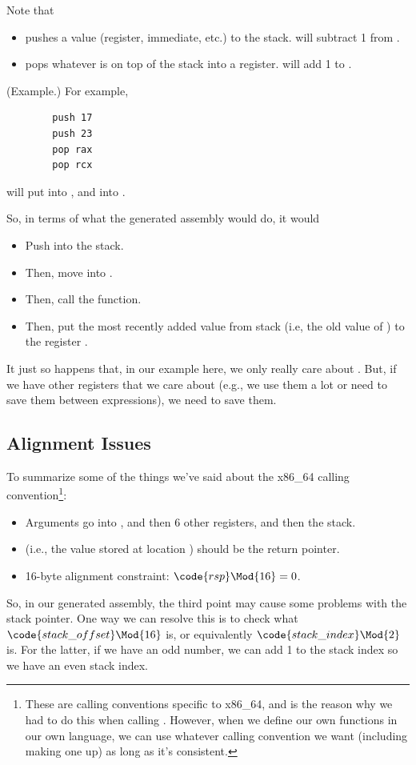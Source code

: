 \bigskip 

Note that 
\begin{itemize}
    \item {} pushes a value (register, immediate, etc.) to the stack.  will subtract 1 from . 
    \item {} pops whatever is on top of the stack into a register.  will add 1 to . 
\end{itemize}
\begin{mdframed}[nobreak=true]
    (Example.) For example, 
    \begin{verbatim}
        push 17 
        push 23 
        pop rax 
        pop rcx \end{verbatim}
    will put  into , and  into .
\end{mdframed}
So, in terms of what the generated assembly would do, it would 
\begin{itemize}
    \item Push  into the stack. 
    \item Then, move  into .
    \item Then, call the  function. 
    \item Then, put the most recently added value from stack (i.e, the old value of ) to the register .
\end{itemize}
It just so happens that, in our example here, we only really care about . But, if we have other registers that we care about (e.g., we use them a lot or need to save them between expressions), we need to save them. 

\subsection{Alignment Issues}
To summarize some of the things we've said about the x86\_64 calling convention\footnote{These are calling conventions specific to x86\_64, and is the reason why we had to do this when calling . However, when we define our own functions in our own language, we can use whatever calling convention we want (including making one up) as long as it's consistent. }:
\begin{itemize}
    \item Arguments go into , and then 6 other registers, and then the stack.
    \item \code{[rsp]} (i.e., the value stored at location ) should be the return pointer.
    \item 16-byte alignment constraint: $\code{rsp} \Mod{16} = 0$.
\end{itemize}
So, in our generated assembly, the third point may cause some problems with the stack pointer. One way we can resolve this is to check what $\code{stack\_offset} \Mod{16}$ is, or equivalently $\code{stack\_index} \Mod{2}$ is. For the latter, if we have an odd number, we can add 1 to the stack index so we have an even stack index.
